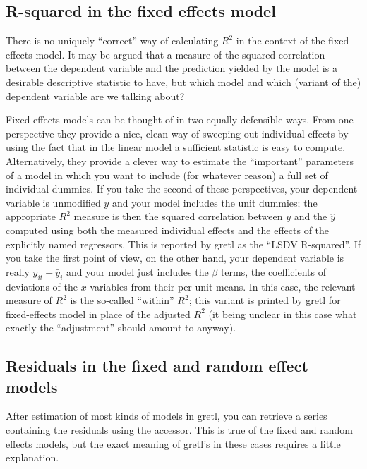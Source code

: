 \subsection{R-squared in the fixed effects model}

There is no uniquely ``correct'' way of calculating $R^2$ in the
context of the fixed-effects model.  It may be argued that a measure
of the squared correlation between the dependent variable and the
prediction yielded by the model is a desirable descriptive statistic
to have, but which model and which (variant of the) dependent
variable are we talking about?

Fixed-effects models can be thought of in two equally defensible ways.
From one perspective they provide a nice, clean way of sweeping out
individual effects by using the fact that in the linear model a
sufficient statistic is easy to compute. Alternatively, they provide a
clever way to estimate the ``important'' parameters of a model in
which you want to include (for whatever reason) a full set of
individual dummies.  If you take the second of these perspectives,
your dependent variable is unmodified $y$ and your model includes the
unit dummies; the appropriate $R^2$ measure is then the squared
correlation between $y$ and the $\hat{y}$ computed using both the
measured individual effects and the effects of the explicitly named
regressors. This is reported by gretl as the ``LSDV R-squared''. If
you take the first point of view, on the other hand, your dependent
variable is really $y_{it} - \bar{y}_i$ and your model just includes
the $\beta$ terms, the coefficients of deviations of the $x$ variables
from their per-unit means. In this case, the relevant measure of $R^2$
is the so-called ``within'' $R^2$; this variant is printed by gretl
for fixed-effects model in place of the adjusted $R^2$ (it being
unclear in this case what exactly the ``adjustment'' should amount to
anyway).

\subsection{Residuals in the fixed and random effect models}
\label{panel-uhat}

After estimation of most kinds of models in gretl, you can retrieve
a series containing the residuals using the  accessor.
This is true of the fixed and random effects models, but the exact
meaning of gretl's  in these cases requires a little
explanation.

